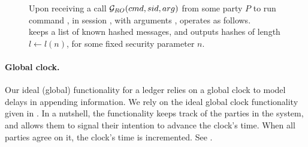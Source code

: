 \begin{figure}[ht]
  \begin{framed}
    \begin{minipage}[t]{\textwidth}
      \textrm{Upon receiving a call $\mathcal{G}_{RO}(cmd,sid,arg)$ from some party
        $P$ to run command \cmd, in session \sid, with arguments \arg,
        \IdealGRO operates as follows.} \\
      \textrm{\IdealGRO keeps a list \hashlist of known hashed messages, and
        outputs hashes of length $l \gets l(n)$, for some fixed security
        parameter $n$.}
    \end{minipage}
    \vspace*{0.5em}
    
    \centering
  \end{framed}
\end{figure}

\paragraph{Global clock.} %
Our ideal (global) functionality for a ledger relies on a global clock to model
delays in appending information. We rely on the ideal global clock functionality
given in \cite{kkk21}. In a nutshell, the functionality keeps track of the
parties in the system, and allows them to signal their intention to advance the
clock's time. When all parties agree on it, the clock's time is incremented. See
.


